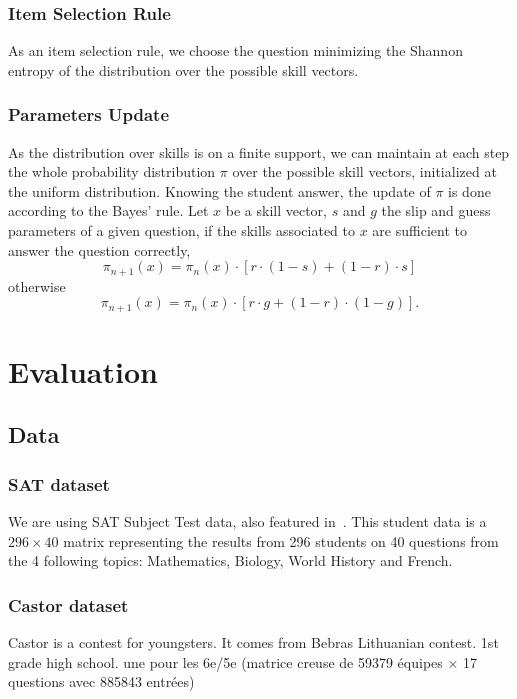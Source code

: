 \documentclass{sig-alternate}
\begin{document}
\subsubsection{Item Selection Rule}

As an item selection rule, we choose the question minimizing the Shannon entropy of the distribution over the possible skill vectors.

\subsubsection{Parameters Update}

As the distribution over skills is on a finite support, we can maintain at each step the whole probability distribution $\pi$ over the possible skill vectors, initialized at the uniform distribution.
Knowing the student answer, the update of $\pi$ is done according to the Bayes' rule. Let $x$ be a skill vector, $s$ and $g$ the slip and guess parameters of a given question, if the skills associated to $x$ are sufficient to answer the question correctly,
\[ \pi_{n+1}(x) = \pi_n(x) \cdot [r\cdot(1-s) + (1-r)\cdot s] \]
otherwise
\[ \pi_{n+1}(x) = \pi_n(x) \cdot [r\cdot g + (1-r)\cdot(1-g)]. \]

\section{Evaluation}

\subsection{Data} %

\subsubsection{SAT dataset}

We are using SAT Subject Test data, also featured in~\citep{Winters2005, Desmarais2011}. This student data is a $296 \times 40$ matrix representing the results from 296 students on 40 questions from the 4 following topics: Mathematics, Biology, World History and French.

\subsubsection{Castor dataset}

Castor is a contest for youngsters. It comes from Bebras Lithuanian contest. 1st grade high school.
une pour les 6e/5e (matrice creuse de 59379 équipes $\times$ 17 questions avec 885843 entrées)
\end{document}
